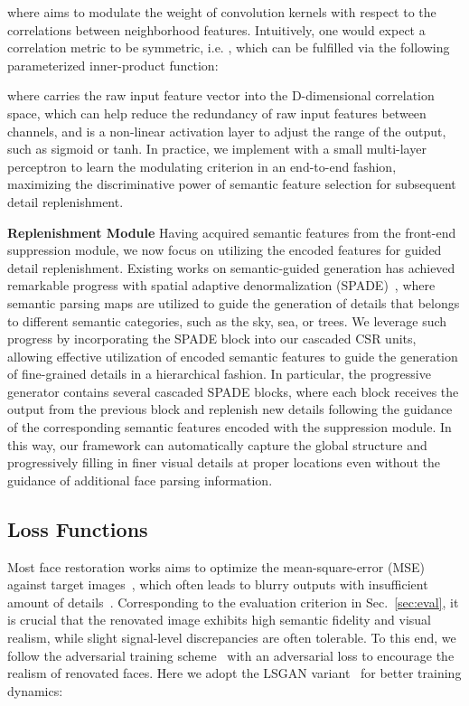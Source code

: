 \documentclass[sigconf]{acmart}
\begin{document}
where  aims to modulate the weight of convolution kernels with respect to the correlations between neighborhood features. Intuitively, one would expect a correlation metric to be symmetric, i.e. , which can be fulfilled via the following parameterized inner-product function:



where  carries the raw input feature vector  into the D-dimensional correlation space, which can help reduce the redundancy of raw input features between channels, and  is a non-linear activation layer to adjust the range of the output, such as sigmoid or tanh. In practice, we implement  with a small multi-layer perceptron to learn the modulating criterion in an end-to-end fashion, maximizing the discriminative power of semantic feature selection for subsequent detail replenishment.

\textbf{Replenishment Module}
Having acquired semantic features from the front-end suppression module, we now focus on utilizing the encoded features for guided detail replenishment. Existing works on semantic-guided generation has achieved remarkable progress with spatial adaptive denormalization (SPADE)~\cite{spade}, where semantic parsing maps are utilized to guide the generation of details that belongs to different semantic categories, such as the sky, sea, or trees. We leverage such progress by incorporating the SPADE block into our cascaded CSR units, allowing effective utilization of encoded semantic features to guide the generation of fine-grained details in a hierarchical fashion. In particular, the progressive generator contains several cascaded SPADE blocks, where each block receives the output from the previous block and replenish new details following the guidance of the corresponding semantic features encoded with the suppression module. In this way, our framework can automatically capture the global structure and progressively filling in finer visual details at proper locations even without the guidance of additional face parsing information.

\subsection{Loss Functions}\label{sec:loss}
Most face restoration works aims to optimize the mean-square-error (MSE) against target images~\cite{srcnn}\cite{vdsr}\cite{edsr}, which often leads to blurry outputs with insufficient amount of details~\cite{esrgan}.
Corresponding to the evaluation criterion in Sec.~\ref{sec:eval}, it is crucial that the renovated image exhibits high semantic fidelity and visual realism, while slight signal-level discrepancies are often tolerable. To this end, we follow the adversarial training scheme~\cite{gan} with an adversarial loss  to encourage the realism of renovated faces. Here we adopt the LSGAN variant~\cite{lsgan} for better training dynamics:
\end{document}
